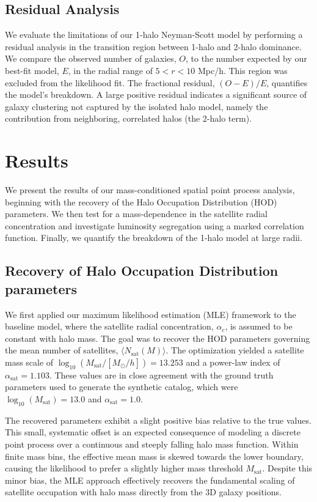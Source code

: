 \documentclass[]{article}
\begin{document}
\subsection{Residual Analysis}
We evaluate the limitations of our 1-halo Neyman-Scott model by performing a residual analysis in the transition region between 1-halo and 2-halo dominance. We compare the observed number of galaxies, $O$, to the number expected by our best-fit model, $E$, in the radial range of $5 < r < 10$ Mpc/h. This region was excluded from the likelihood fit. The fractional residual, $(O-E)/E$, quantifies the model's breakdown. A large positive residual indicates a significant source of galaxy clustering not captured by the isolated halo model, namely the contribution from neighboring, correlated halos (the 2-halo term).

\section{Results}
\label{sec:results}
We present the results of our mass-conditioned spatial point process analysis, beginning with the recovery of the Halo Occupation Distribution (HOD) parameters. We then test for a mass-dependence in the satellite radial concentration and investigate luminosity segregation using a marked correlation function. Finally, we quantify the breakdown of the 1-halo model at large radii.

\subsection{Recovery of Halo Occupation Distribution parameters}
We first applied our maximum likelihood estimation (MLE) framework to the baseline model, where the satellite radial concentration, $\alpha_c$, is assumed to be constant with halo mass. The goal was to recover the HOD parameters governing the mean number of satellites, $\langle N_{\text{sat}}(M) \rangle$. The optimization yielded a satellite mass scale of $\log_{10}(M_{\text{sat}}/[M_\odot/h]) = 13.253$ and a power-law index of $\alpha_{\text{sat}} = 1.103$. These values are in close agreement with the ground truth parameters used to generate the synthetic catalog, which were $\log_{10}(M_{\text{sat}}) = 13.0$ and $\alpha_{\text{sat}} = 1.0$.

The recovered parameters exhibit a slight positive bias relative to the true values. This small, systematic offset is an expected consequence of modeling a discrete point process over a continuous and steeply falling halo mass function. Within finite mass bins, the effective mean mass is skewed towards the lower boundary, causing the likelihood to prefer a slightly higher mass threshold $M_{\text{sat}}$. Despite this minor bias, the MLE approach effectively recovers the fundamental scaling of satellite occupation with halo mass directly from the 3D galaxy positions.
\end{document}
